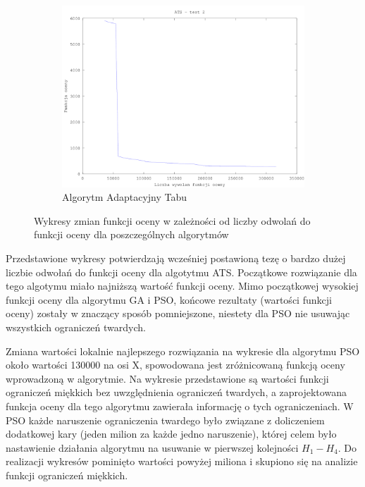 \begin{figure}[H]
          \\
        \begin{subfigure}[b]{0.5\textwidth}
                \includegraphics[width=\textwidth]{ats_test_2.png}
                \caption{Algorytm Adaptacyjny Tabu}
        \end{subfigure}
        \caption{Wykresy zmian funkcji oceny w zależności od liczby odwolań do funkcji oceny dla poszczególnych algorytmów}
\end{figure}


\par Przedstawione wykresy potwierdzają wcześniej postawioną tezę o bardzo dużej liczbie odwołań do funkcji oceny dla algotytmu ATS. Początkowe rozwiązanie dla tego algotymu miało najniższą wartość funkcji oceny. Mimo początkowej wysokiej funkcji oceny dla algorytmu GA i PSO, końcowe rezultaty (wartości funkcji oceny) zostały w znaczący sposób pomniejszone, niestety dla PSO nie usuwając wszystkich ograniczeń twardych. 
\par Zmiana wartości lokalnie najlepszego rozwiązania na wykresie dla algorytmu PSO około wartości 130000 na osi X, spowodowana jest zróżnicowaną funkcją oceny wprowadzoną w algorytmie. Na wykresie przedstawione są wartości funkcji ograniczeń miękkich bez uwzględnienia ograniczeń twardych, a zaprojektowana funkcja oceny dla tego algorytmu zawierała informację o tych ograniczeniach. W PSO każde naruszenie ograniczenia twardego było związane z doliczeniem dodatkowej kary (jeden milion za każde jedno naruszenie), której celem było nastawienie działania algorytmu na usuwanie w pierwszej kolejności ${H_{1}- H_{4}}$. Do realizacji wykresów pominięto wartości powyżej miliona i skupiono się na analizie funkcji ograniczeń miękkich.


